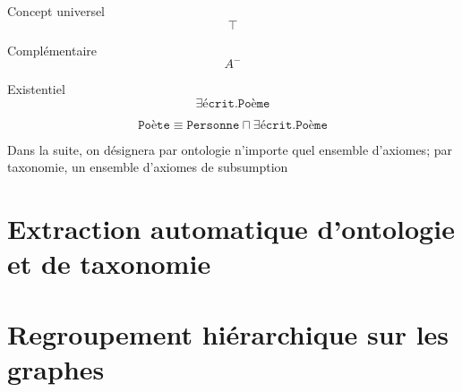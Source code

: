 Concept universel
\begin{equation}
    \top
\end{equation}

Complémentaire
\begin{equation}
    A^-
\end{equation}

Existentiel
\begin{equation}
    \exists \texttt{écrit}.\texttt{Poème}
\end{equation}

\begin{equation}
    \texttt{Poète} \equiv \texttt{Personne} \sqcap \exists \texttt{écrit}.\texttt{Poème}
\end{equation}



Dans la suite, on désignera par ontologie n'importe quel ensemble d'axiomes; par taxonomie, un ensemble d'axiomes de subsumption



\section{Extraction automatique d'ontologie et de taxonomie}






\section{Regroupement hiérarchique sur les graphes}
